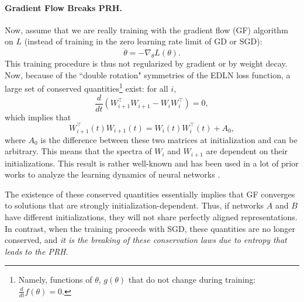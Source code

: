 \documentclass[11pt]{article}
\theoremstyle{plain}
\begin{document}
\paragraph{Gradient Flow Breaks PRH.} Now, assume that we are really training with the gradient flow (GF) algorithm on $L$ (instead of training in the zero learning rate limit of GD or SGD):
\begin{equation}
    \dot{\theta} = - \nabla_\theta L (\theta).
\end{equation}
This training procedure is thus not regularized by gradient or by weight decay. Now, because of the ``double rotation" symmetries of the EDLN loss function, a large set of conserved quantities\footnote{Namely, functions of $\theta$, $g(\theta)$ that do not change during training: $\frac{d}{dt} f(\theta)=0$.} exist: for all $i$,
\begin{equation}
    \frac{d}{dt}(W_{i+1}^\top W_{i+1} -  W_{i} W_{i}^\top) = 0,
\end{equation}
which implies that 
\begin{equation}
    W_{i+1}^\top (t) W_{i+1} (t) = W_{i} (t) W_{i}^\top(t) + A_0,
\end{equation}
where $A_0$ is the difference between these two matrices at initialization and can be arbitrary. This means that the spectra of $W_i$ and $W_{i+1}$ are dependent on their initializations. This result is rather well-known and has been used in a lot of prior works to analyze the learning dynamics of neural networks \cite{du2018algorithmic}.

The existence of these conserved quantities essentially implies that GF converges to solutions that are strongly initialization-dependent. Thus, if networks $A$ and $B$ have different initializations, they will not share perfectly aligned representations. In contrast, when the training proceeds with SGD, these quantities are no longer conserved, and \textit{it is the breaking of these conservation laws due to entropy that leads to the PRH}.
\end{document}
